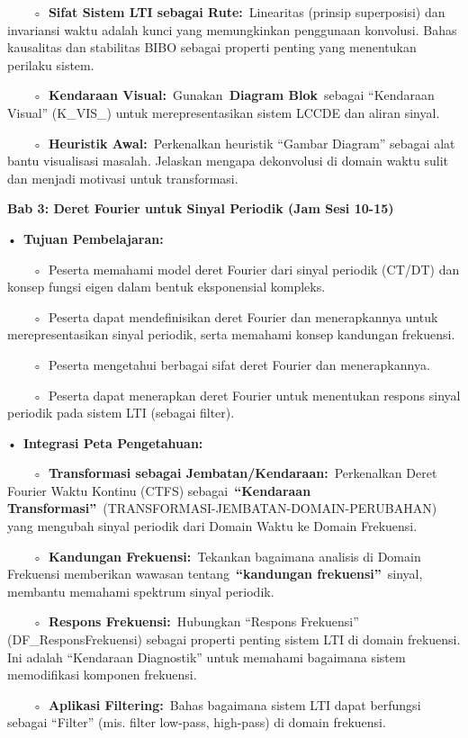 \documentclass[
  letterpaper,
  DIV=11,
  numbers=noendperiod]{scrreprt}
\begin{document}
~~~~◦~\textbf{Sifat Sistem LTI sebagai Rute:}~Linearitas (prinsip
superposisi) dan invariansi waktu adalah kunci yang memungkinkan
penggunaan konvolusi. Bahas kausalitas dan stabilitas BIBO sebagai
properti penting yang menentukan perilaku sistem.

~~~~◦~\textbf{Kendaraan Visual:}~Gunakan~\textbf{Diagram Blok}~sebagai
``Kendaraan Visual'' (K\_VIS\_) untuk merepresentasikan sistem LCCDE dan
aliran sinyal.

~~~~◦~\textbf{Heuristik Awal:}~Perkenalkan heuristik ``Gambar Diagram''
sebagai alat bantu visualisasi masalah. Jelaskan mengapa dekonvolusi di
domain waktu sulit dan menjadi motivasi untuk transformasi.

\textbf{Bab 3: Deret Fourier untuk Sinyal Periodik (Jam Sesi 10-15)}

•~\textbf{Tujuan Pembelajaran:}

~~~~◦~Peserta memahami model deret Fourier dari sinyal periodik (CT/DT)
dan konsep fungsi eigen dalam bentuk eksponensial kompleks.

~~~~◦~Peserta dapat mendefinisikan deret Fourier dan menerapkannya untuk
merepresentasikan sinyal periodik, serta memahami konsep kandungan
frekuensi.

~~~~◦~Peserta mengetahui berbagai sifat deret Fourier dan menerapkannya.

~~~~◦~Peserta dapat menerapkan deret Fourier untuk menentukan respons
sinyal periodik pada sistem LTI (sebagai filter).

•~\textbf{Integrasi Peta Pengetahuan:}

~~~~◦~\textbf{Transformasi sebagai Jembatan/Kendaraan:}~Perkenalkan
Deret Fourier Waktu Kontinu (CTFS) sebagai~\textbf{``Kendaraan
Transformasi''}~(TRANSFORMASI-JEMBATAN-DOMAIN-PERUBAHAN) yang mengubah
sinyal periodik dari Domain Waktu ke Domain Frekuensi.

~~~~◦~\textbf{Kandungan Frekuensi:}~Tekankan bagaimana analisis di
Domain Frekuensi memberikan wawasan tentang~\textbf{``kandungan
frekuensi''}~sinyal, membantu memahami spektrum sinyal periodik.

~~~~◦~\textbf{Respons Frekuensi:}~Hubungkan ``Respons Frekuensi''
(DF\_ResponsFrekuensi) sebagai properti penting sistem LTI di domain
frekuensi. Ini adalah ``Kendaraan Diagnostik'' untuk memahami bagaimana
sistem memodifikasi komponen frekuensi.

~~~~◦~\textbf{Aplikasi Filtering:}~Bahas bagaimana sistem LTI dapat
berfungsi sebagai ``Filter'' (mis. filter low-pass, high-pass) di domain
frekuensi.
\end{document}
